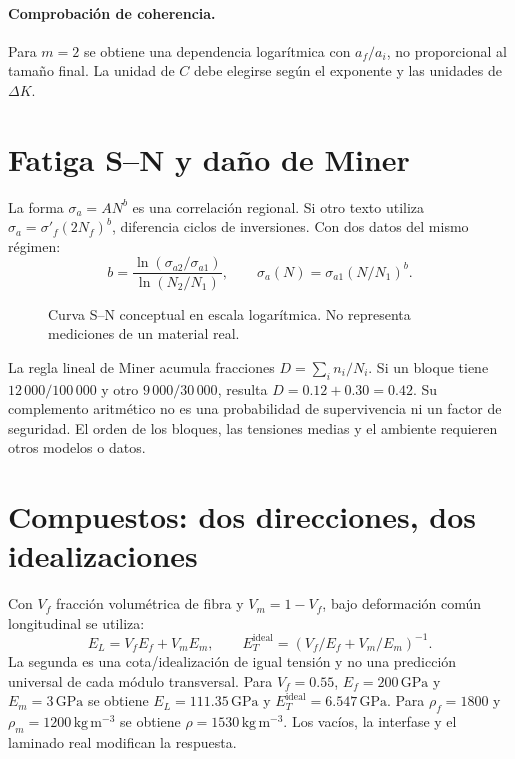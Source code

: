 \paragraph{Comprobación de coherencia.} Para $m=2$ se obtiene una dependencia logarítmica con $a_f/a_i$, no proporcional al tamaño final. La unidad de $C$ debe elegirse según el exponente y las unidades de $\Delta K$.

\section{Fatiga S--N y daño de Miner}
La forma $\sigma_a=A N^b$ es una correlación regional. Si otro texto utiliza $\sigma_a=\sigma'_f(2N_f)^b$, diferencia ciclos de inversiones. Con dos datos del mismo régimen:
\begin{equation}
b=\frac{\ln(\sigma_{a2}/\sigma_{a1})}{\ln(N_2/N_1)},\qquad
\sigma_a(N)=\sigma_{a1}(N/N_1)^b.
\end{equation}
\begin{figure}[htbp]\centering
{}
\caption{Curva S--N conceptual en escala logarítmica. No representa mediciones de un material real.}
\label{fig:av-matmo-basquin}
\end{figure}
La regla lineal de Miner acumula fracciones $D=\sum_i n_i/N_i$. Si un bloque tiene $12\,000/100\,000$ y otro $9\,000/30\,000$, resulta $D=0.12+0.30=0.42$. Su complemento aritmético no es una probabilidad de supervivencia ni un factor de seguridad. El orden de los bloques, las tensiones medias y el ambiente requieren otros modelos o datos.

\section{Compuestos: dos direcciones, dos idealizaciones}
Con $V_f$ fracción volumétrica de fibra y $V_m=1-V_f$, bajo deformación común longitudinal se utiliza:
\begin{equation}
E_L=V_fE_f+V_mE_m,\qquad
E_T^{\mathrm{ideal}}=\left(V_f/E_f+V_m/E_m\right)^{-1}.
\end{equation}
La segunda es una cota/idealización de igual tensión y no una predicción universal de cada módulo transversal. Para $V_f=0.55$, $E_f=200\,\mathrm{GPa}$ y $E_m=3\,\mathrm{GPa}$ se obtiene $E_L=111.35\,\mathrm{GPa}$ y $E_T^{\mathrm{ideal}}=6.547\,\mathrm{GPa}$. Para $\rho_f=1800$ y $\rho_m=1200\,\mathrm{kg\,m^{-3}}$ se obtiene $\rho=1530\,\mathrm{kg\,m^{-3}}$. Los vacíos, la interfase y el laminado real modifican la respuesta.
